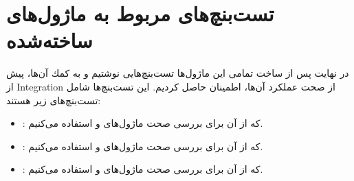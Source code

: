 \section*{
	تست‌بنچ‌های مربوط به ماژول‌های ساخته‌شده
}
در نهايت پس از ساخت تمامى اين ماژول‌ها تست‌بنچ‌هايى نوشتيم و به كمك آن‌ها، پيش از Integration از صحت عملكرد آ‌ن‌ها، اطمينان حاصل كرديم.
این تست‌بنچ‌ها شامل تست‌بنچ‌های زیر هستند:
\begin{itemize}
	\item \textbf{}:
	که از آن برای بررسی صحت ماژول‌های 
	و
	استفاده می‌کنیم.
	
	\item \textbf{}:
	که از آن برای بررسی صحت ماژول‌های 
	و
	استفاده می‌کنیم.
	\item \textbf{}:
	که از آن برای بررسی صحت ماژول‌های 
و
	استفاده می‌کنیم.
\end{itemize}
